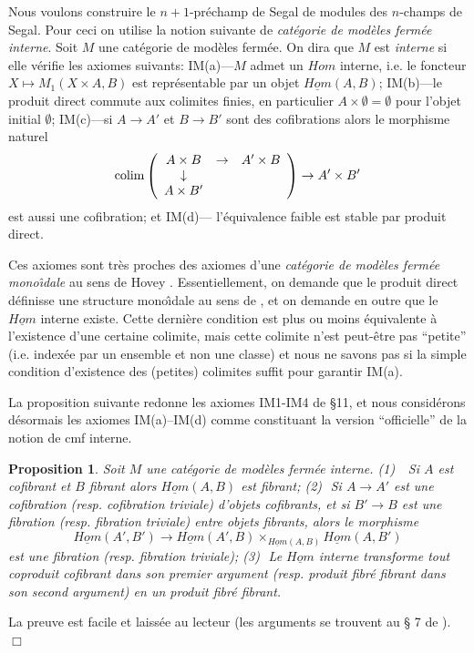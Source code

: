 \documentclass[12pt]{article}
\newcommand{\eop}{\hfill $\Box$\vspace{.1in}}
\newtheorem{proposition}[lemma]{Proposition}
\begin{document}
Nous voulons construire le $n+1$-pr\'echamp de Segal de modules des
$n$-champs de Segal. Pour ceci on utilise la notion suivante de {\em cat\'egorie
de mod\`eles ferm\'ee interne}. Soit $M$ une cat\'egorie de mod\`eles ferm\'ee.
On dira que $M$ est {\em interne} si elle v\'erifie les axiomes suivants:
\newline
IM(a)---$M$ admet un $Hom$ interne, i.e. le foncteur $X\mapsto M_1(X\times A,
B)$ est repr\'esentable par un objet $\underline{Hom} (A,B)$;
\newline
IM(b)---le produit direct commute aux colimites finies, en particulier $A\times
\emptyset = \emptyset$ pour l'objet initial $\emptyset$;
\newline
IM(c)---si $A\rightarrow A'$ et $B\rightarrow B'$ sont des cofibrations alors
le morphisme naturel
$$
{\rm colim} \left(
\begin{array}{ccc}
A\times B & \rightarrow & A'\times B \\
\downarrow &&  \\
A\times B' & &
\end{array}
\right) \rightarrow A'\times B'
$$
est aussi une cofibration; et
\newline
IM(d)--- l'\'equivalence faible est stable par produit direct.

Ces axiomes sont tr\`es proches des axiomes d'une {\em cat\'egorie de
mod\`eles ferm\'ee mo\-no\^{\i}\-da\-le}
au  sens de Hovey \cite{HoveyMonMod}. Essentiellement, on
demande que le produit direct d\'efinisse une structure mono\^{\i}dale
au sens
de \cite{HoveyMonMod}, et  on demande en outre que le $\underline{Hom}$
interne existe. Cette derni\`ere condition est plus ou moins
\'equivalente \`a
l'existence d'une certaine colimite, mais cette
colimite n'est peut-\^etre pas
``petite'' (i.e. index\'ee par un ensemble et non une classe)
et nous ne savons
pas si la simple condition d'existence des (petites) colimites suffit pour
garantir
IM(a).

La proposition suivante redonne les axiomes IM1-IM4 de
\cite{nCAT} \S 11, et nous consid\'erons d\'esormais
les axiomes IM(a)--IM(d) comme constituant la version
``officielle'' de la notion de cmf interne.

\begin{proposition}
\label{interne}
Soit $M$ une cat\'egorie de mod\`eles ferm\'ee interne.
\newline
(1) \,\, Si $A$ est cofibrant et $B$ fibrant alors $\underline{Hom}(A,B)$ est
fibrant; \newline
(2)\,\, Si $A\rightarrow A'$ est une cofibration (resp. cofibration triviale)
d'objets cofibrants, et si $B'\rightarrow B$ est une fibration (resp. fibration
triviale) entre objets fibrants, alors le morphisme
$$
\underline{Hom}(A',B')\rightarrow
\underline{Hom}(A',B) \times _{\underline{Hom}(A,B) }\underline{Hom}(A,B')
$$
est une fibration (resp. fibration triviale);
\newline
(3)\,\, Le $\underline{Hom}$ interne transforme tout coproduit
cofibrant dans
son premier argument
(resp. produit fibr\'e  fibrant dans son second argument) en un produit
fibr\'e fibrant.
\end{proposition}
La preuve est facile et laiss\'ee au lecteur (les arguments se trouvent au \S
7 de \cite{nCAT}).
\eop
\end{document}
